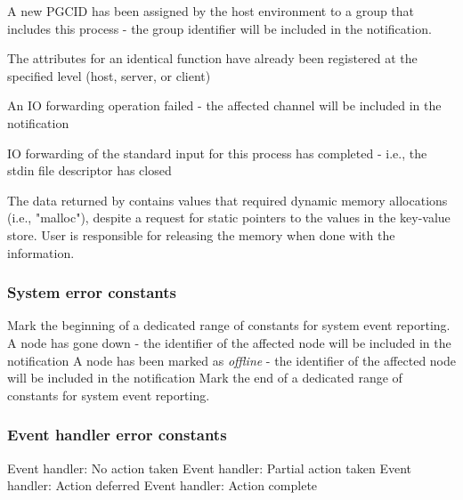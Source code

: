 \begin{constantdesc}
%
A new \ac{PGCID} has been assigned by the host environment to a group that includes this process - the group identifier will be included in the notification.

%
The attributes for an identical function have already been registered at the specified level (host, server, or client)

%
An \ac{IO} forwarding operation failed - the affected channel will be included in the notification

%
\ac{IO} forwarding of the standard input for this process has completed - i.e., the stdin file descriptor has closed

%
The data returned by  contains values that required dynamic memory allocations (i.e., "malloc"), despite a request for static pointers to the values in the key-value store. User is responsible for releasing the memory when done with the information.

\end{constantdesc}

\subsubsection{System error constants}

\begin{constantdesc}
%
Mark the beginning of a dedicated range of constants for system event reporting.
%
A node has gone down - the identifier of the affected node will be included in the notification
%
A node has been marked as \emph{offline} - the identifier of the affected node will be included in the notification
%
Mark the end of a dedicated range of constants for system event reporting.
\end{constantdesc}
%

\subsubsection{Event handler error constants}

\begin{constantdesc}
%
Event handler: No action taken
%
Event handler: Partial action taken
%
Event handler: Action deferred
%
Event handler: Action complete
%
\end{constantdesc}

